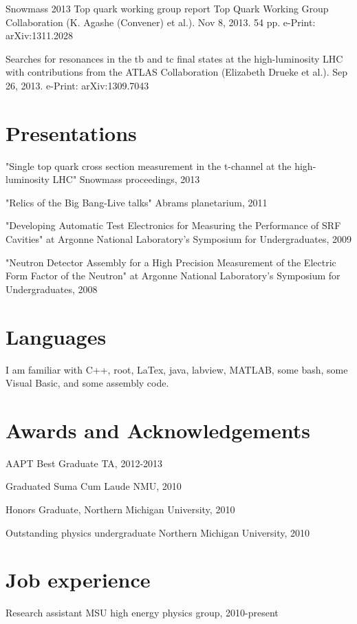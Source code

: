 \documentclass{article}
\begin{document}
Snowmass 2013 Top quark working group report
Top Quark Working Group Collaboration (K. Agashe (Convener) et al.). Nov 8, 2013. 54 pp.
e-Print: arXiv:1311.2028 

Searches for resonances in the tb and tc final states at the high-luminosity LHC
with contributions from the ATLAS Collaboration (Elizabeth Drueke et al.). Sep 26, 2013.
e-Print: arXiv:1309.7043


\section{Presentations}
\hspace{0.5cm}"Single top quark cross section measurement in the t-channel at the high-luminosity LHC" Snowmass proceedings, 2013

"Relics of the Big Bang-Live talks" Abrams planetarium, 2011

"Developing Automatic Test Electronics for Measuring the Performance of SRF Cavities" at Argonne National Laboratory’s Symposium for Undergraduates, 2009

"Neutron Detector Assembly for a High Precision Measurement of the Electric Form Factor of the Neutron" at Argonne National Laboratory’s Symposium for Undergraduates, 2008


\section{Languages}
\hspace{0.5cm}I am familiar with C++, root, LaTex, java, labview, MATLAB, some bash, some Visual Basic, and some assembly code. 


\section{Awards and Acknowledgements}
\hspace{0.5cm}AAPT Best Graduate TA, 2012-2013

Graduated Suma Cum Laude NMU, 2010

Honors Graduate, Northern Michigan University, 2010

Outstanding physics undergraduate Northern Michigan University, 2010


\section{Job experience}
\hspace{0.5cm}Research assistant MSU high energy physics group, 2010-present
\end{document}
